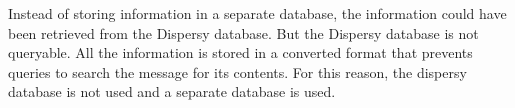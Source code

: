 Instead of storing information in a separate database,
the information could have been retrieved from the Dispersy database.
But the Dispersy database is not queryable.
All the information is stored in a converted format
that prevents queries to search the message for its contents.
For this reason, the dispersy database is not used and a separate database is used.







